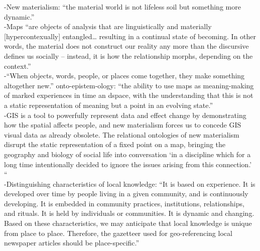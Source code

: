 -{\color{orange}New materialism: “the material world is not lifeless soil but something more dynamic.”\cite{McQueenBaker2019}}\\
-{\color{orange}Maps “are objects of analysis that are linguistically and materially [hypercontexually] entangled… resulting in a continual state of becoming. In other words, the material does not construct our reality any more than the discursive defines us socially -- instead, it is how the relationship morphs, depending on the context.”\cite{McQueenBaker2019}}\\
-{\color{orange}“When objects, words, people, or places come together, they make something altogether new.” onto-epistem-ology: “the ability to use maps as meaning-making of marked experiences in time an dspace, with the understanding that this is not a static representation of meaning but a point in an evolving state.”\cite{McQueenBaker2019}}\\
-{\color{orange}GIS is a tool to powerfully represent data and effect change by demonstrating how the spatial affects people, and new materialism forces us to concede GIS visual data as already obsolete. The relational ontologies of new materialism disrupt the static representation of a fixed point on a map, bringing the geography and biology of social life into conversation ‘in a discipline which for a long time intentionally decided to ignore the issues arising from this connection.’ “\cite{McQueenBaker2019}}\\
-{\color{orange}Distinguishing characteristics of local knowledge: “It is based on experience. It is developed over time by people living in a given community, and is continuously developing. It is embedded in community practices, institutions, relationships, and rituals. It is held by individuals or communities. It is dynamic and changing. Based on these characteristics, we may anticipate that local knowledge is unique from place to place. Therefore, the gazetteer used for geo-referencing local newspaper articles should be place-specific.”\cite{Cai2016}}\\

